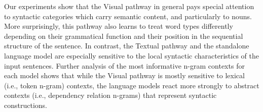 Our experiments show that the {\sc Visual} pathway in general 
pays special attention to syntactic categories which carry semantic 
content, and particularly to nouns. More surprisingly, this pathway also 
learns to treat word types differently depending on their 
grammatical function and their position in the sequential structure of 
the sentence. In contrast, the {\sc Textual} pathway and the standalone 
language model are especially sensitive to the local syntactic 
characteristics of the input sentences.  Further analysis of the most 
informative n-gram contexts for each model shows that while the 
{\sc Visual} pathway is mostly sensitive to lexical (i.e., token n-gram) 
contexts, the language models react more strongly to abstract contexts
(i.e., dependency relation n-grams) that represent syntactic constructions. 

